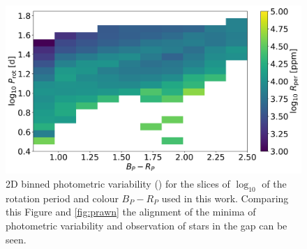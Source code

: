 \begin{figure}
\centering
    \includegraphics[width=\textwidth]{Figures/rot_gap_figures/rot_dist_binned.png}
    \caption{
    2D binned photometric variability (\rper{}) for the slices of $\log_10$ of the rotation period and colour \gaia $B_P-R_P$ used in this work. Comparing this Figure and \ref{fig:prawn} the alignment of the minima of photometric variability and observation of stars in the gap can be seen.}
    \label{fig:binned_rper_full_sample}
\end{figure}


